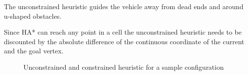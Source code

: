 The unconstrained heuristic guides the vehicle away from dead ends and around u-shaped obstacles.

Since HA* can reach any point in a cell the unconstrained heuristic needs to be discounted by the absolute difference of the continuous coordinate of the current and the goal vertex.

\begin{figure}[h]
    \caption{Unconstrained and constrained heuristic for a sample configuration}
    \label{fig:heuristics}
\end{figure}